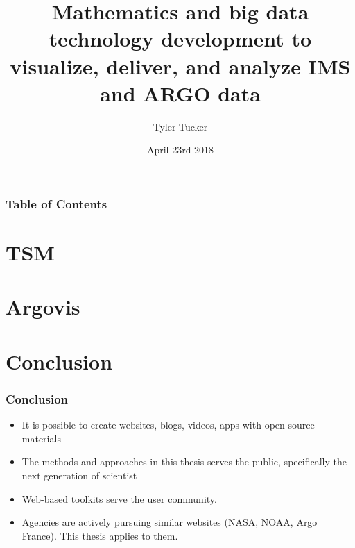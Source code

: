 \documentclass[hyperref={bookmarks=false},aspectratio=169]{beamer}
\title[IMS and ARGO data visualization and delivery]
{\bfseries{Mathematics and big data technology development to visualize, deliver, and analyze IMS and ARGO data}}
\author{Tyler Tucker}
\institute{San Diego State University}
\date{April 23rd 2018}
\begin{document}
\titlepage  %

\begin{frame}
\frametitle{Table of Contents}
\tableofcontents
\end{frame}



\section{TSM}


\section{Argovis}


\section{Conclusion}

\begin{frame}
\frametitle{Conclusion}
\begin{itemize}
    \item It is possible to create websites, blogs, videos, apps with open source materials
    \item The methods and approaches in this thesis serves the public, specifically the next generation of scientist
    \item Web-based toolkits serve the user community.
    \item Agencies are actively pursuing similar websites (NASA, NOAA, Argo France). This thesis applies to them.
    
\end{itemize}
\end{frame}
\end{document}
